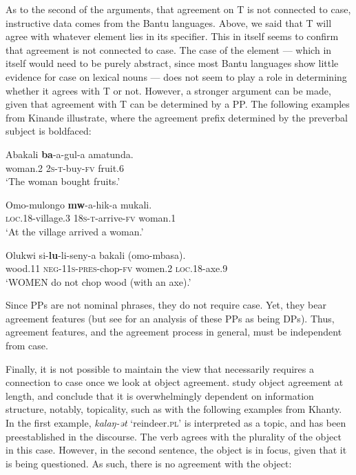 \documentclass[output=paper
,modfonts
,nonflat]{langsci/langscibook}
\begin{document}
As to the second of the arguments, that agreement on T is not connected to case, instructive data comes from the Bantu languages.
Above, we said that T will agree with whatever element lies in its specifier.
This in itself seems to confirm that agreement is not connected to case. The case of the element --- which in itself would need to be purely abstract, since most Bantu languages show little evidence for case on lexical nouns --- does not seem to play a role in determining whether it agrees with T or not.
However, a stronger argument can be made, given that agreement with T can be determined by a PP.
The following examples from Kinande illustrate, where the agreement prefix determined by the preverbal subject is boldfaced:

\begin{exe}
	\ex
	\begin{xlist}
		\ex
		\gll Abakali \textbf{ba}-a-gul-a amatunda.\\
		woman.\textsc{2} \textsc{2s-t}-buy-\textsc{fv} fruit.\textsc{6}\\
		\glt `The woman bought fruits.'

		\ex
		\gll Omo-mulongo \textbf{mw}-a-hik-a mukali.\\
		\textsc{loc.18}-village.\textsc{3} \textsc{18s-t}-arrive-\textsc{fv} woman.\textsc{1}\\
		\glt `At the village arrived a woman.'

		\ex
		\gll Olukwi si-\textbf{lu}-li-seny-a bakali (omo-mbasa).\\
		wood.\textsc{11} \textsc{neg-11s-pres}-chop-\textsc{fv} women.\textsc{2} \textsc{loc.18}-axe.\textsc{9}\\
		\glt `WOMEN do not chop wood (with an axe).'

	\end{xlist}
\end{exe}
Since PPs are not nominal phrases, they do not require case.
Yet, they bear agreement features (but see \citealt{Carstens1997} for an analysis of these PPs as being DPs). Thus, agreement features, and the agreement process in general, must be independent from case.

Finally, it is not possible to maintain the view that {\agr} necessarily requires a connection to case once we look at object agreement.
\citet{dn2011} study object agreement at length, and conclude that it is overwhelmingly dependent on information structure, notably, topicality, such as with the following examples from Khanty.
In the first example, \textit{kalaŋ-ət} `reindeer.\textsc{pl}' is interpreted as a topic, and has been preestablished in the discourse. The verb agrees with the plurality of the object in this case.
However, in the second sentence, the object is in focus, given that it is being questioned.
As such, there is no agreement with the object:
\end{document}
